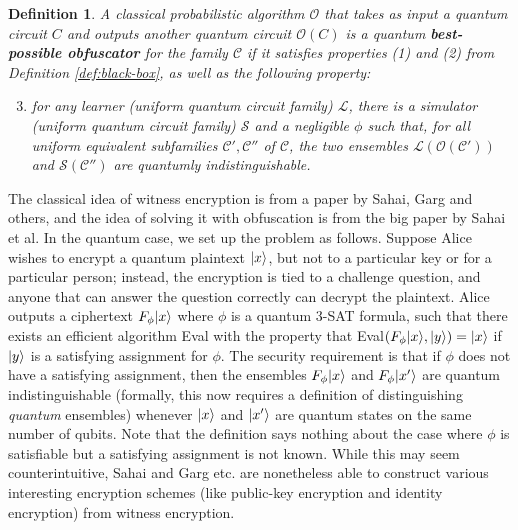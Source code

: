 \documentclass[11pt]{article}
\numberwithin{equation}{section}
\newtheorem{definition}{Definition}
\begin{document}
\begin{definition} A classical probabilistic algorithm $\mathcal O$ that takes as input a quantum circuit $C$ and outputs another quantum circuit $\mathcal O(C)$ is a quantum {\bf best-possible obfuscator} for the family $\mathcal C$ if it satisfies properties (1) and (2) from Definition \ref{def:black-box}, as well as the following property:
\begin{enumerate}
\setcounter{enumi}{2}
\item for any learner (uniform quantum circuit family) $\mathcal L$, there is a simulator (uniform quantum circuit family) $\mathcal S$ and a negligible $\phi$ such that, for all uniform equivalent subfamilies $\mathcal C', \mathcal C''$ of $\mathcal C$, the two ensembles $\mathcal L(\mathcal O(\mathcal C'))$ and $\mathcal S(\mathcal C'')$ are quantumly indistinguishable.
\end{enumerate}
\end{definition}

 The classical idea of witness encryption is from a paper by Sahai, Garg and others, and the idea of solving it with obfuscation is from the big paper by Sahai et al. In the quantum case, we set up the problem as follows. Suppose Alice wishes to encrypt a quantum plaintext ${\left\vert{x}\right\rangle}$, but not to a particular key or for a particular person; instead, the encryption is tied to a challenge question, and anyone that can answer the question correctly can decrypt the plaintext. Alice outputs a ciphertext $F_\phi {\left\vert{x}\right\rangle}$ where $\phi$ is a quantum 3-SAT formula, such that there exists an efficient algorithm Eval with the property that Eval$(F_\phi{\left\vert{x}\right\rangle}, {\left\vert{y}\right\rangle}) = {\left\vert{x}\right\rangle}$ if ${\left\vert{y}\right\rangle}$ is a satisfying assignment for $\phi$. The security requirement is that if $\phi$ does not have a satisfying assignment, then the ensembles $F_\phi {\left\vert{x}\right\rangle}$ and $F_\phi {\left\vert{x'}\right\rangle}$ are quantum indistinguishable (formally, this now requires a definition of distinguishing \emph{quantum} ensembles) whenever ${\left\vert{x}\right\rangle}$ and ${\left\vert{x'}\right\rangle}$ are quantum states on the same number of qubits. Note that the definition says nothing about the case where $\phi$ is satisfiable but a satisfying assignment is not known. While this may seem counterintuitive, Sahai and Garg etc. are nonetheless able to construct various interesting encryption schemes (like public-key encryption and identity encryption) from witness encryption. 
\end{document}

